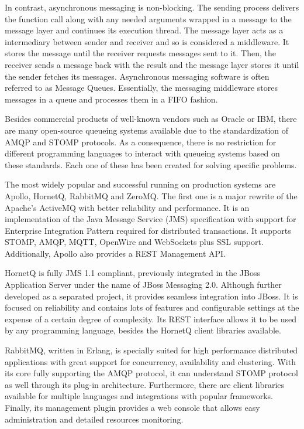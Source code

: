 In contrast, asynchronous messaging is non-blocking. The sending process delivers the function call along with any needed arguments wrapped in a message to the message layer and continues its execution thread. The message layer acts as a intermediary between sender and receiver and so is considered a middleware. It stores the message until the receiver requests messages sent to it. Then, the receiver sends a message back with the result and the message layer stores it until the sender fetches its messages. Asynchronous messaging software is often referred to as Message Queues. Essentially, the messaging middleware stores messages in a queue and processes them in a FIFO fashion.

Besides commercial products of well-known vendors such as Oracle or IBM, there are many open-source queueing systems available \cite{queues} due to the standardization of AMQP and STOMP protocols. As a consequence, there is no restriction for different programming languages to interact with queueing systems based on these standards. Each one of these has been created for solving specific problems.

The most widely popular and successful running on production systems are Apollo, HornetQ, RabbitMQ and ZeroMQ. The first one is a major rewrite of the Apache's ActiveMQ with better reliability and performance. It is an implementation of the Java Message Service (JMS) specification with support for Enterprise Integration Pattern required for distributed transactions. It supports STOMP, AMQP, MQTT, OpenWire and WebSockets plus SSL support. Additionally, Apollo also provides a REST Management API.

HornetQ is fully JMS 1.1 compliant, previously integrated in the JBoss Application Server under the name of JBoss Messaging 2.0. Although further developed as a separated project, it provides seamless integration into JBoss. It is focused on reliability and contains lots of features and configurable settings at the expense of a certain degree of complexity. Its REST interface allows it to be used by any programming language, besides the HornetQ client libraries available.

RabbitMQ, written in Erlang, is specially suited for high performance distributed applications with great support for concurrency, availability and clustering. With its core fully supporting the AMQP protocol, it can understand STOMP protocol as well through its plug-in architecture. Furthermore, there are client libraries available for multiple languages and integrations with popular frameworks. Finally, its management plugin provides a web console that allows easy administration and detailed resources monitoring.


